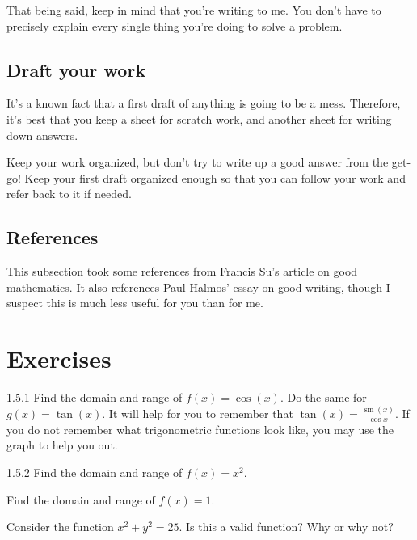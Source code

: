 That being said, keep in mind that you're writing to me. You don't have to precisely explain every single thing you're doing to solve a problem. 

\subsection{Draft your work}

It's a known fact that a first draft of anything is going to be a mess. Therefore, it's best that you keep a sheet for scratch work, and another sheet for writing down answers. 

Keep your work organized, but don't try to write up a good answer from the get-go! Keep your first draft organized enough so that you can follow your work and refer back to it if needed.

\subsection{References}

This subsection took some references from Francis Su's \cite{su:2015} article on good mathematics. It also references Paul Halmos' \cite{halmos} essay on good writing, though I suspect this is much less useful for you than for me. 

\section{Exercises}

\begin{exercise}{1.5.1}
Find the domain and range of $f(x) = \cos(x)$. Do the same for $g(x) = \tan(x)$. It will help for you to remember that $\tan(x) = \frac{\sin(x)}{\cos{x}}$. If you do not remember what trigonometric functions look like, you may use the graph to help you out. 
\end{exercise}

\begin{exercise}{1.5.2}
Find the domain and range of $f(x) = x^2$.
\end{exercise}

\begin{exercise}
Find the domain and range of $f(x) = 1$.
\end{exercise}

\begin{exercise}
Consider the function $x^2 + y^2 = 25$. Is this a valid function? Why or why not?
\end{exercise}

